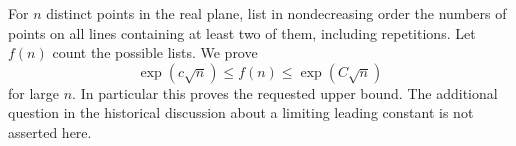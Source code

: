 For $n$ distinct points in the real plane, list in nondecreasing order the numbers of points on all lines containing at least two of them, including repetitions. Let $f(n)$ count the possible lists. We prove
\[
 \exp(c\sqrt n)\leq f(n)\leq\exp(C\sqrt n)
\]
for large $n$. In particular this proves the requested upper bound. The additional question in the historical discussion about a limiting leading constant is not asserted here.
